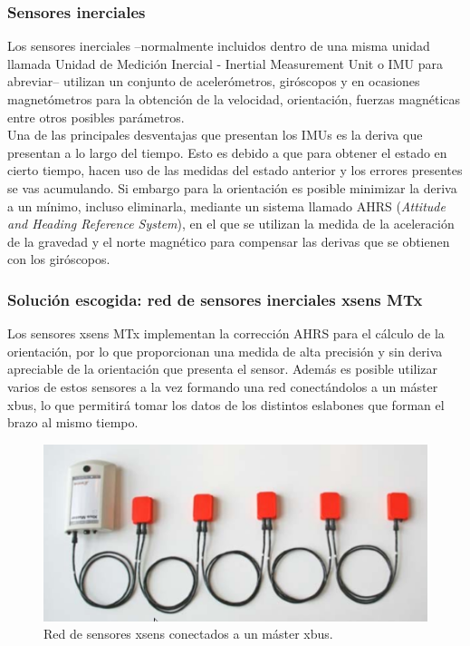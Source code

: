 \documentclass[12pt, a4paper]{report}
\begin{document}
\subsubsection{Sensores inerciales}

Los sensores inerciales --normalmente incluidos dentro de una misma unidad llamada Unidad de Medición Inercial - Inertial Measurement Unit o IMU para abreviar-- utilizan un conjunto de acelerómetros, giróscopos y en ocasiones magnetómetros para la obtención de la velocidad, orientación, fuerzas magnéticas entre otros posibles parámetros. \\

Una de las principales desventajas que presentan los IMUs es la deriva que presentan a lo largo del tiempo. Esto es debido a que para obtener el estado en cierto tiempo, hacen uso de las medidas del estado anterior y los errores presentes se vas acumulando. Si embargo para la orientación es posible minimizar la deriva a un mínimo, incluso eliminarla, mediante un sistema llamado AHRS (\textit{Attitude and Heading Reference System}), en el que se utilizan la medida de la aceleración de la gravedad y el norte magnético para compensar las derivas que se obtienen con los giróscopos.

\subsubsection{Solución escogida: red de sensores inerciales xsens MTx}

Los sensores xsens MTx implementan la corrección AHRS para el cálculo de la orientación, por lo que proporcionan una medida de alta precisión y sin deriva apreciable de la orientación que presenta el sensor. Además es posible utilizar varios de estos sensores a la vez formando una red conectándolos a un máster xbus, lo que permitirá tomar los datos de los distintos eslabones que forman el brazo al mismo tiempo.

\begin{figure}[h]
	\centering
		\includegraphics[scale=0.4]{../img/xbus_master.png} 
	\caption[Red de sensores xsens conectados a un máster xbus]{Red de sensores xsens conectados a un máster xbus.} 
	\label{fig: xbus_master}
\end{figure}
\end{document}
